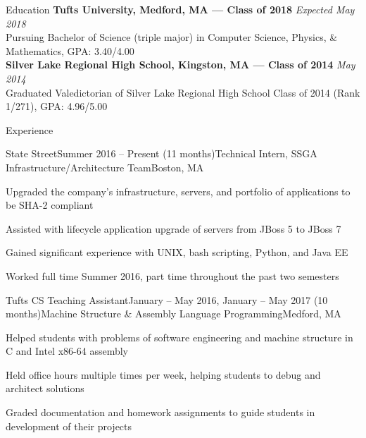 \documentclass{resume}
\begin{document}
  \begin{rSection}{Education}
    {\bf Tufts University, Medford, MA --- Class of 2018} \hfill {\em Expected May 2018} \\ 
    { Pursuing Bachelor of Science (triple major) in Computer Science, Physics, \& Mathematics, GPA: 3.40/4.00 }\\
    {\bf Silver Lake Regional High School, Kingston, MA --- Class of 2014} \hfill {\em May 2014}\\ 
    { Graduated Valedictorian of Silver Lake Regional High School Class of 2014 (Rank 1/271), GPA: 4.96/5.00 }
  \end{rSection}

  \begin{rSection}{Experience}
    \begin{rSubsection}{State Street}{Summer 2016 -- Present (11 months)}{Technical Intern, SSGA Infrastructure/Architecture Team}{Boston, MA}
    \item Upgraded the company’s infrastructure, servers, and portfolio of applications to be SHA-2 compliant
    \item Assisted with lifecycle application upgrade of servers from JBoss 5 to JBoss 7
    \item Gained significant experience with UNIX, bash scripting, Python, and Java EE
    \item Worked full time Summer 2016, part time throughout the past two semesters
    \end{rSubsection}

    \begin{rSubsection}{Tufts CS Teaching Assistant}{January -- May 2016, January -- May 2017 (10 months)}{Machine Structure \& Assembly Language Programming}{Medford, MA}
    \item Helped students with problems of software engineering and machine structure in C and Intel x86-64 assembly
    \item Held office hours multiple times per week, helping students to debug and architect solutions
    \item Graded documentation and homework assignments to guide students in development of their projects
    \end{rSubsection}
  \end{rSection}
\end{document}
